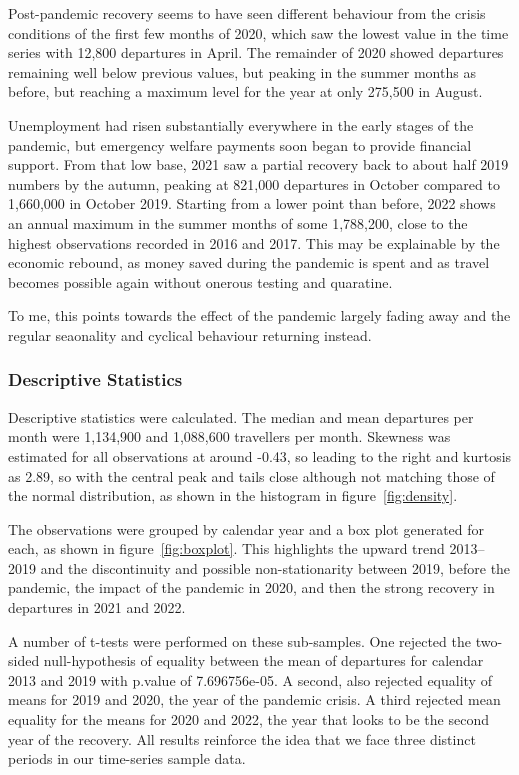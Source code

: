\documentclass[conference]{IEEEtran}
\begin{document}
Post-pandemic recovery seems to have seen different behaviour from the crisis conditions of the first few months of 2020, which saw the lowest value in the time series with 12,800 departures in April.  The remainder of 2020 showed departures remaining well below previous values, but peaking in the summer months as before, but reaching a maximum level for the year at only 275,500 in August.  

Unemployment had risen substantially everywhere in the early stages of the pandemic, but emergency welfare payments soon began to provide financial support.  From that low base, 2021 saw a partial recovery back to about half 2019 numbers by the autumn, peaking at 821,000 departures in October compared to 1,660,000 in October 2019.  Starting from a lower point than before, 2022 shows an annual maximum in the summer months of some 1,788,200, close to the highest observations recorded in 2016 and 2017.  This may be explainable by the economic rebound, as money saved during the pandemic is spent and as travel becomes possible again without onerous testing and quaratine.  

To me, this points towards the effect of the pandemic largely fading away and the regular seaonality and cyclical behaviour returning instead.  

\subsubsection{Descriptive Statistics}

Descriptive statistics were calculated.  The median and mean departures per month were 1,134,900 and 1,088,600 travellers per month.  Skewness was estimated for all observations at around -0.43, so leading to the right and kurtosis as 2.89, so with the central peak and tails close although not matching those of the normal distribution, as shown in the histogram in figure~\ref{fig:density}.  

The observations were grouped by calendar year and a box plot generated for each, as shown in figure~\ref{fig:boxplot}.  This highlights the upward trend 2013--2019 and the discontinuity and possible non-stationarity between 2019, before the pandemic, the impact of the pandemic in 2020, and then the strong recovery in departures in 2021 and 2022.    

A number of t-tests were performed on these sub-samples.  One rejected the two-sided null-hypothesis of equality between the mean of departures for calendar 2013 and 2019 with p.value of 7.696756e-05. A second, also rejected equality of means for 2019 and 2020, the year of the pandemic crisis.  A third rejected mean equality for the means for 2020 and 2022, the year that looks to be the second year of the recovery.  All results reinforce the idea that we face three distinct periods in our time-series sample data.  
\end{document}

